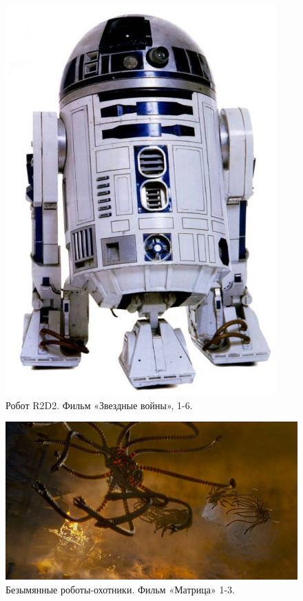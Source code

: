 \begin{figure}[h!]
	\begin{center}
		\includegraphics[width=1\linewidth]{chapters/chapter1/images/8}
		\caption{Робот R2D2. Фильм «Звездные войны», 1-6.}
		\label{ris:image1x8}
	\end{center}
\end{figure}
\clearpage
\begin{figure}[h!]
	\begin{center}
		\includegraphics[width=1\linewidth]{chapters/chapter1/images/9}
		\caption{Безымянные роботы-охотники. Фильм «Матрица» 1-3.}
		\label{ris:image1x9}
	\end{center}
\end{figure}	

